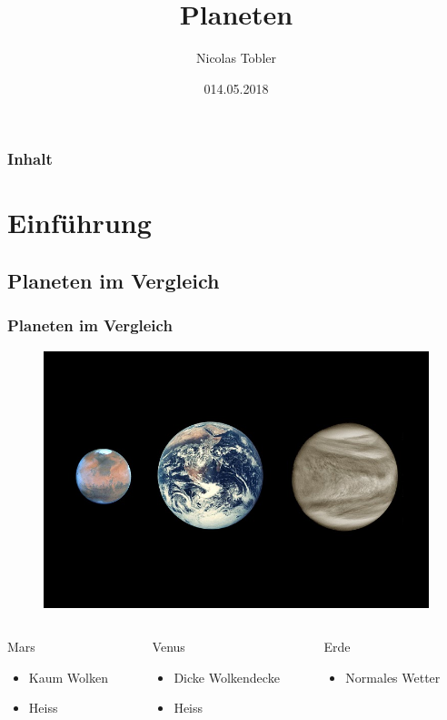 \documentclass{beamer}
\title{Planeten}
\author{Nicolas Tobler}
\institute{Mathematisches Seminar 2018}
\date{014.05.2018}
\begin{document}
\begin{frame}
\titlepage
\end{frame}

\begin{frame}
\frametitle{Inhalt}
\tableofcontents
\end{frame}

\section{Einführung}

\subsection{Planeten im Vergleich}
\begin{frame}
	\frametitle{Planeten im Vergleich}
	
	\begin{figure}
	\center
	\includegraphics[width=0.7\linewidth]{Pictures/planets.jpg}
	\end{figure}
	
\begin{columns}
\begin{column}{0.33\textwidth}
   Mars
   \begin{itemize}
   		\item[] Kaum Wolken
   		\item[] Heiss
   \end{itemize}
\end{column}
\begin{column}{0.33\textwidth}
   Venus
   \begin{itemize}
   		\item[] Dicke Wolkendecke
   		\item[] Heiss
   \end{itemize}
\end{column}
\begin{column}{0.33\textwidth}
   Erde
   \begin{itemize}
   		\item[] Normales Wetter
   \end{itemize}
\end{column}
\end{columns}
\end{frame}
\end{document}
